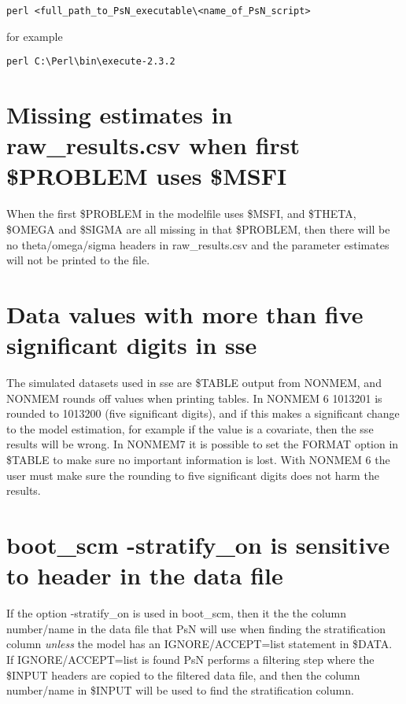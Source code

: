 \begin{verbatim}
perl <full_path_to_PsN_executable\<name_of_PsN_script>
\end{verbatim}

for example

\begin{verbatim}
perl C:\Perl\bin\execute-2.3.2
\end{verbatim}

\section{Missing estimates in raw\_results.csv when first \$PROBLEM uses \$MSFI}
When the first \$PROBLEM in the modelfile uses \$MSFI, and \$THETA, \$OMEGA and \$SIGMA are all missing in that \$PROBLEM, then there will be no theta/omega/sigma headers in raw\_results.csv and the parameter estimates will not be printed to the file.

\section{Data values with more than five significant digits in sse}
The simulated datasets used in sse are \$TABLE output from NONMEM, and NONMEM rounds off values when printing tables. In NONMEM 6 1013201 is rounded to 1013200 (five significant digits), and if this makes a significant change to the model estimation, for example if the value is a covariate, then the sse results will be wrong. In NONMEM7 it is possible to set the FORMAT option in \$TABLE to make sure no important information is lost. With NONMEM 6 the user must make sure the rounding to five significant digits does not harm the results.

\section{boot\_scm -stratify\_on is sensitive to header in the data file}
If the option -stratify\_on is used in boot\_scm, then it the the column number/name in the
data file that PsN will use when finding the stratification column \emph{unless} the model has 
an IGNORE/ACCEPT=list statement in \$DATA. If IGNORE/ACCEPT=list is found 
PsN performs a filtering step where the \$INPUT headers are copied
to the filtered data file, and then the column number/name in
\$INPUT will be used to find the stratification column. 


